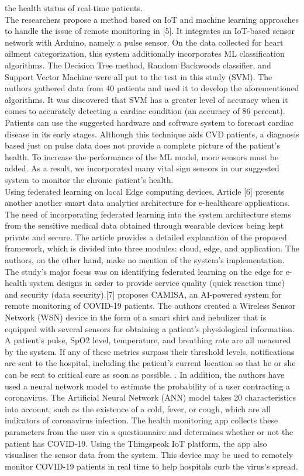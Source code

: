 \documentclass{bmcart}
\begin{document}
the health status of real-time patients.\\
The researchers propose a method based on IoT and machine learning approaches to
handle the issue of remote monitoring in [5]. It integrates an IoT-based sensor
network with Arduino, namely a pulse sensor. On the data collected for heart
ailment categorization, this system additionally incorporates ML classification
algorithms. The Decision Tree method, Random Backwoods classifier, and Support
Vector Machine were all put to the test in this study (SVM). The authors
gathered data from 40 patients and used it to develop the aforementioned
algorithms. It was discovered that SVM has a greater level of accuracy when it
comes to accurately detecting a cardiac condition (an accuracy of 86 percent).
Patients can use the suggested hardware and software system to forecast cardiac
disease in its early stages. Although this technique aids CVD patients, a
diagnosis based just on pulse data does not provide a complete picture of the
patient's health. To increase the performance of the ML model, more sensors must
be added. As a result, we incorporated many vital sign sensors in our suggested
system to monitor the chronic patient's health.\\
Using federated learning on local Edge computing devices, Article [6] presents
another another smart data analytics architecture for e-healthcare applications.
The need of incorporating federated learning into the system architecture stems
from the sensitive medical data obtained through wearable devices being kept
private and secure. The article provides a detailed explanation of the proposed
framework, which is divided into three modules: cloud, edge, and application.
The authors, on the other hand, make no mention of the system's implementation.
The study's major focus was on identifying federated learning on the edge for
e-health system designs in order to provide service quality (quick reaction
time) and security (data security).[7] proposes CAMISA, an AI-powered system for
remote monitoring of COVID-19 patients. The authors created a Wireless Sensor
Network (WSN) device in the form of a smart shirt and nebulizer that is equipped
with several sensors for obtaining a patient's physiological information. A
patient's pulse, SpO2 level, temperature, and breathing rate are all measured by
the system. If any of these metrics surpass their threshold levels,
notifications are sent to the hospital, including the patient's current location
so that he or she can be sent to critical care as soon as possible. . In
addition, the authors have used a neural network model to estimate the
probability of a user contracting a coronavirus. The Artificial Neural Network
(ANN) model takes 20 characteristics into account, such as the existence of a
cold, fever, or cough, which are all indicators of coronavirus infection. The
health monitoring app collects these parameters from the user via a
questionnaire and determines whether or not the patient has COVID-19. Using the
Thingspeak IoT platform, the app also visualises the sensor data from the
system. This device may be used to remotely monitor COVID-19 patients in real
time to help hospitals curb the virus's spread.
\end{document}
